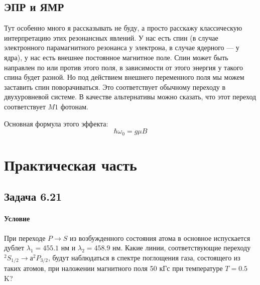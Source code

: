 \documentclass[12pt]{article}
\begin{document}
\subsection{ЭПР и ЯМР}
Тут особенно много я рассказывать не буду, а просто расскажу классическую интерпретацию этих резонансных явлений. У нас есть спин (в случае электронного парамагнитного резонанса у электрона, в случае ядерного --- у ядра), у нас есть внешнее постоянное магнитное поле. Спин может быть направлен по или против этого поля, в зависимости от этого энергия у такого спина будет разной. Но под действием внешнего переменного поля мы можем заставить спин поворачиваться. Это соответствует обычному переходу в двухуровневой системе. В качестве альтернативы можно сказать, что этот переход соответствует $M1$ фотонам.

Основная формула этого эффекта:
\begin{equation*}
    \hbar \omega_0 = g\mu B
\end{equation*}


\section{Практическая часть}
\subsection{Задача 6.21}
\label{task_6.21}
\paragraph{Условие} При переходе $P \rightarrow S$ из возбужденного состояния атома в основное испускается дублет $\lambda_1 = 455.1$ нм и $\lambda_2 = 458.9$ нм. Какие линии, соответствующие переходу $^2S_{1/2} \rightarrow а^2P_{3/2}$, будут наблюдаться в спектре поглощения газа, состоящего из таких атомов, при наложении магнитного поля 50 кГс при температуре $T=0.5$ K?
\end{document}
